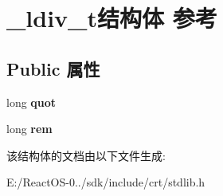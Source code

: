 \hypertarget{struct__ldiv__t}{}\section{\+\_\+ldiv\+\_\+t结构体 参考}
\label{struct__ldiv__t}
\subsection*{Public 属性}
\begin{DoxyCompactItemize}
\item 
\mbox{\label{struct__ldiv__t_ad92e024764ab6ab13f87ec13d9000015}} 
long {\bfseries quot}
\item 
\mbox{\label{struct__ldiv__t_af652497da5239640a273e1969ba6edf8}} 
long {\bfseries rem}
\end{DoxyCompactItemize}


该结构体的文档由以下文件生成\+:\begin{DoxyCompactItemize}
\item 
E\+:/\+React\+O\+S-\/0../sdk/include/crt/stdlib.\+h\end{DoxyCompactItemize}
